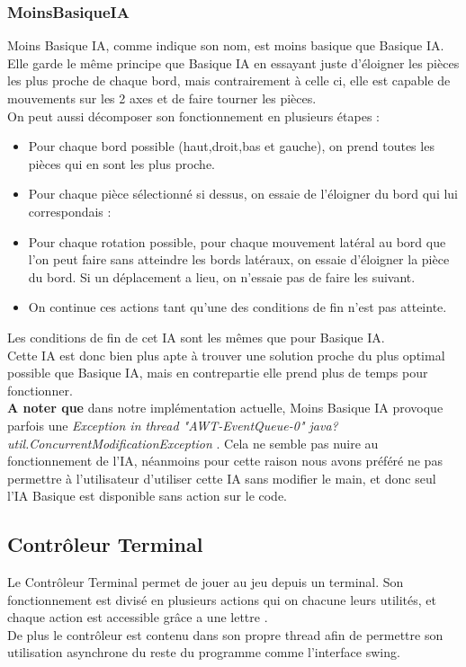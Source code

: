 \documentclass[a4paper,12pt]{article} %
\begin{document}
\subsubsection{MoinsBasiqueIA}
Moins Basique IA, comme indique son nom, est moins basique que Basique IA.
Elle garde le même principe que Basique IA en essayant juste d'éloigner les pièces les plus proche de chaque bord, mais contrairement à celle ci, elle est capable de mouvements sur les 2 axes et de faire tourner les pièces. \\
On peut aussi décomposer son fonctionnement en plusieurs étapes :
\begin{itemize}
    \item Pour chaque bord possible (haut,droit,bas et gauche), on prend toutes les pièces qui en sont les plus proche.
    \item Pour chaque pièce sélectionné si dessus, on essaie de l'éloigner du bord qui lui correspondais :
    \item Pour chaque rotation possible, pour chaque mouvement latéral au bord que l'on peut faire sans atteindre les bords latéraux, on essaie d'éloigner la pièce du bord. Si un déplacement a lieu, on n'essaie pas de faire les suivant.
    \item On continue ces actions tant qu'une des conditions de fin n'est pas atteinte. 
\end{itemize}

Les conditions de fin de cet IA sont les mêmes que pour Basique IA. \\

Cette IA est donc bien plus apte à trouver une solution proche du plus optimal possible que Basique IA, mais en contrepartie elle prend plus de temps pour fonctionner. \\
\textbf{A noter que} dans notre implémentation actuelle, Moins Basique IA provoque parfois une \textit{Exception in thread "AWT-EventQueue-0" java?util.ConcurrentModificationException} . Cela ne semble pas nuire au fonctionnement de l'IA, néanmoins pour cette raison nous avons préféré ne pas permettre à l'utilisateur d'utiliser cette IA sans modifier le main, et donc seul l'IA Basique est disponible sans action sur le code.

\subsection{Contrôleur Terminal}
Le Contrôleur Terminal permet de jouer au jeu depuis un terminal.
Son fonctionnement est divisé en plusieurs actions qui on chacune leurs utilités,
et chaque action est accessible grâce a une lettre . \\
De plus le contrôleur est contenu dans son propre thread afin de permettre
son utilisation asynchrone du reste du programme comme l'interface swing.
\end{document}
